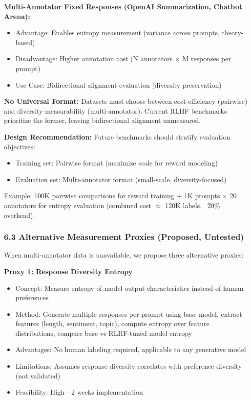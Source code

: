 \textbf{Multi-Annotator Fixed Responses (OpenAI Summarization, Chatbot Arena):}
\begin{itemize}
\item Advantage: Enables entropy measurement (variance across prompts, theory-based)
\item Disadvantage: Higher annotation cost (N annotators $\times$ M responses per prompt)
\item Use Case: Bidirectional alignment evaluation (diversity preservation)
\end{itemize}

\textbf{No Universal Format:} Datasets must choose between cost-efficiency (pairwise) and diversity-measurability (multi-annotator). Current RLHF benchmarks prioritize the former, leaving bidirectional alignment unmeasured.

\textbf{Design Recommendation:} Future benchmarks should stratify evaluation objectives:
\begin{itemize}
\item Training set: Pairwise format (maximize scale for reward modeling)
\item Evaluation set: Multi-annotator format (small-scale, diversity-focused)
\end{itemize}

Example: 100K pairwise comparisons for reward training + 1K prompts $\times$ 20 annotators for entropy evaluation (combined cost $\approx$ 120K labels, ~20\% overhead).

\subsubsection{6.3 Alternative Measurement Proxies (Proposed, Untested)}

When multi-annotator data is unavailable, we propose three alternative proxies:

\textbf{Proxy 1: Response Diversity Entropy}
\begin{itemize}
\item Concept: Measure entropy of model output characteristics instead of human preferences
\item Method: Generate multiple responses per prompt using base model, extract features (length, sentiment, topic), compute entropy over feature distributions, compare base vs RLHF-tuned model entropy
\item Advantages: No human labeling required, applicable to any generative model
\item Limitations: Assumes response diversity correlates with preference diversity (not validated)
\item Feasibility: High---2 weeks implementation
\end{itemize}

